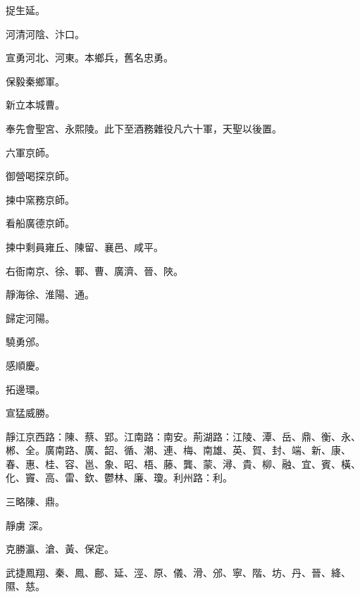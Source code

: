 \begin{pinyinscope}
 捉生延。



 河清河陰、汴口。



 宣勇河北、河東。本鄉兵，舊名忠勇。



 保毅秦鄉軍。



 新立本城曹。



 奉先會聖宮、永熙陵。此下至酒務雜役凡六十軍，天聖以後置。



 六軍京師。



 御營喝探京師。



 揀中窯務京師。



 看船廣德京師。



 揀中剩員雍丘、陳留、襄邑、咸平。



 右衙南京、徐、鄆、曹、廣濟、晉、陜。



 靜海徐、淮陽、通。



 歸定河陽。



 驍勇邠。



 感順慶。



 拓邊環。



 宣猛威勝。



 靜江京西路：陳、蔡、郢。江南路：南安。荊湖路：江陵、潭、岳、鼎、衡、永、郴、全。廣南路、廣、韶、循、潮、連、梅、南雄、英、賀、封、端、新、康、春、惠、桂、容、邕、象、昭、梧、藤、龔、蒙、潯、貴、柳、融、宜、賓、橫、化、竇、高、雷、欽、鬱林、廉、瓊。利州路：利。



 三略陳、鼎。



 靜虜
 深。



 克勝瀛、滄、黃、保定。



 武捷鳳翔、秦、鳳、鄜、延、涇、原、儀、滑、邠、寧、階、坊、丹、晉、絳、隰、慈。




\end{pinyinscope}
